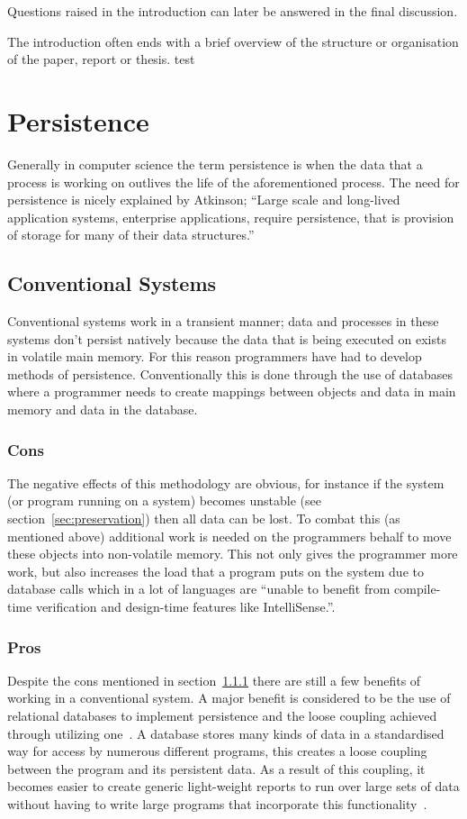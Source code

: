 \documentclass[a4paper,12pt]{article}
\begin{document}
Questions raised in the introduction can later be answered in the final discussion.

The introduction often ends with a brief overview of the structure or organisation of
the paper, report or thesis.
test~\citep{ADearle}
%
\section{Persistence}\label{sec:persistence}
Generally in computer science the term persistence is when the data that a process is working on outlives the life of the aforementioned  process. 
The need for persistence is nicely explained by Atkinson;
``Large scale and long-lived application systems, enterprise applications, require persistence, that is provision of storage for many of their data structures.''~\citep[p.~1]{persistenceandjava}

\subsection{Conventional Systems}
Conventional systems work in a transient manner; data and processes in these systems don't persist natively because the data that is being executed on exists in volatile main memory. For this reason programmers have had to develop methods of persistence. Conventionally this is done through the use of databases where a programmer needs to create mappings between objects and data in main memory and data in the database.
\subsubsection{Cons}\label{sec:cons}
The negative effects of this methodology are obvious, for instance if the system (or program running on a system) becomes unstable (see section~\ref{sec:preservation}) then all data can be lost. To combat this (as mentioned above) additional work is needed on the programmers behalf to move these objects into non-volatile memory. This not only gives the programmer more work, but also increases the load that a program puts on the system due to database calls which in a lot of languages are ``unable to benefit from compile-time verification and design-time features like IntelliSense.''\citep[p~1]{linqsql}.
\subsubsection{Pros}
Despite the cons mentioned in section~\ref{sec:cons} there are still a few benefits of working in a conventional system. A major benefit is considered to be the use of relational databases to implement persistence and the loose coupling achieved through utilizing one~\citep{Databases}.
A database stores many kinds of data in a standardised way for access by numerous different programs, this creates a loose coupling between the program and its persistent data. As a result of this coupling, it becomes easier to create generic light-weight reports to run over large sets of data without having to write large programs that incorporate this functionality~\citep{XML}.
\end{document}

